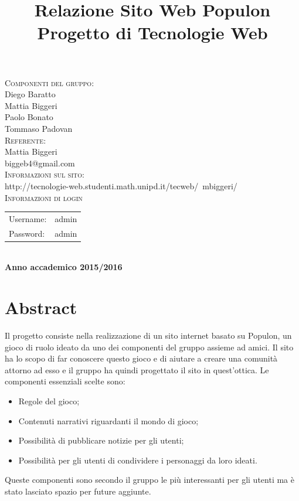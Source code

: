 \documentclass{article}
\title{Relazione Sito Web Populon \\ Progetto di Tecnologie Web} %
\begin{document}
\maketitle %

\begin{center}
\textsc{\LARGE Componenti del gruppo:}\\[0.2cm]
 Diego Baratto \\ %
Mattia Biggeri \\
Paolo Bonato \\
Tommaso Padovan \\[0.2cm]
\textsc{\LARGE Referente:}\\[0.2cm]
 Mattia Biggeri\\
 biggeb4@gmail.com\\[0.2cm]
 \textsc{\LARGE Informazioni sul sito:}\\ [0.2cm]
http://tecnologie-web.studenti.math.unipd.it/tecweb/~mbiggeri/\\[0.2cm]
\textsc{\LARGE Informazioni di login}\\[0.2cm]

\begin{tabular}{l r} 
 Username: & admin\\
 Password: & admin\\
\end{tabular}\\[0.2cm]
\textbf{Anno accademico 2015/2016}
\end{center}

\newpage
\tableofcontents %
\newpage

 \newpage

\section{Abstract}
	Il progetto consiste nella realizzazione di un sito internet basato su Populon, un gioco di ruolo ideato da uno dei
	componenti del gruppo assieme ad amici. Il sito ha lo scopo di far conoscere questo gioco e di aiutare a creare una comunità
	attorno ad esso e il gruppo ha quindi progettato il sito in quest'ottica. Le componenti essenziali scelte sono:
	\begin{itemize}
		\item Regole del gioco;
		\item Contenuti narrativi riguardanti il mondo di gioco;
		\item Possibilità di pubblicare notizie per gli utenti;
		\item Possibilità per gli utenti di condividere i personaggi da loro ideati.	
	\end{itemize}
	Queste componenti sono secondo il gruppo le più interessanti per gli utenti ma è stato lasciato spazio per future aggiunte.
	
\end{document}
